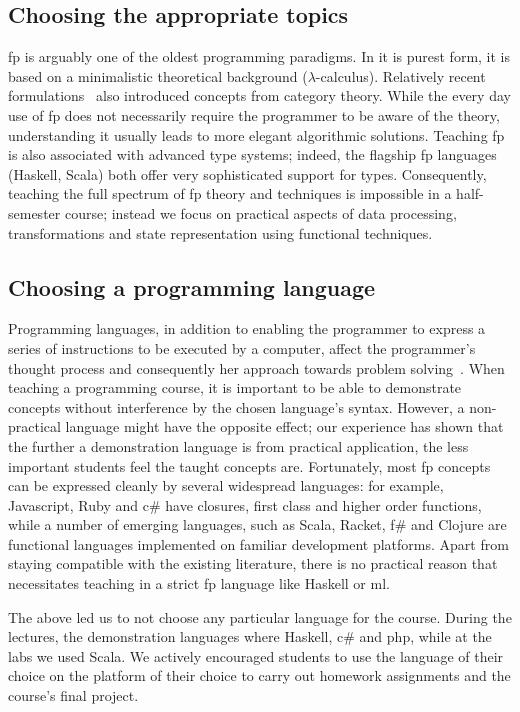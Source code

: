 \documentclass[conference]{sig-alternate}
\begin{document}
\subsection{Choosing the appropriate topics}

{\sc fp} is arguably one of the oldest programming paradigms. In
it is purest form, it is based on a minimalistic theoretical background
($\lambda$-calculus). Relatively recent formulations~\cite{Meije91, Wadle93}
also introduced concepts from category theory. While the every day use of
{\sc fp} does not necessarily require the programmer to be aware
of the theory, understanding it usually leads to more elegant algorithmic
solutions. Teaching {\sc fp} is also associated with advanced type
systems; indeed, the flagship {\sc fp} languages (Haskell, Scala) both offer very sophisticated support for types. Consequently,
teaching the full spectrum of {\sc fp} theory and techniques is impossible in a half-semester course; instead we focus on
practical aspects of data processing, transformations and state representation
using functional techniques.

\subsection{Choosing a programming lan\-guage}

Programming languages, in addition to enabling the programmer to express a
series of instructions to be executed by a computer, affect the programmer's
thought process and consequently her approach towards problem
solving~\cite{Ivers80}.  When teaching a programming course, it is important to
be able to demonstrate concepts without interference by the chosen language's
syntax. However, a non-practical language might have the opposite effect; our
experience has shown that the further a demonstration language is from practical
application, the less important students feel the taught concepts are.
Fortunately, most {\sc fp} concepts can be expressed cleanly by
several widespread languages: for example, Ja\-va\-script, Ruby and {\sc c\#} have
closures, first class and higher order functions, while a number of emerging
languages, such as Scala, Racket, {\sc f\#} and Clojure are functional languages
implemented on familiar development platforms. Apart from staying compatible
with the existing literature, there is no practical reason that necessitates
teaching in a strict {\sc fp} language like Haskell or {\sc ml}.

The above led us to not choose any particular language for the course.  During
the lectures, the demonstration languages where Haskell, {\sc c\#} and {\sc php}, while at the labs we used Scala. We actively encouraged students to use the language of
their choice on the platform of their choice to carry out homework assignments
and the course's final project.
\end{document}
